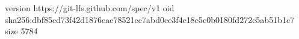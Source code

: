 version https://git-lfs.github.com/spec/v1
oid sha256:dbf85cd73f42d1876eae78521ec7abd0ce3f4c18c5c0b0180fd272c5ab51b1c7
size 5784
